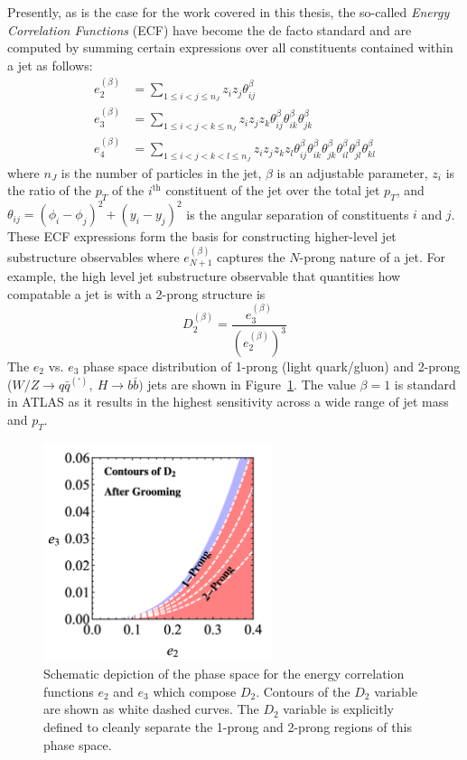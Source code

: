Presently, as is the case for the work covered in this thesis, the so-called \textit{Energy Correlation Functions} (ECF) \cite{Larkoski:2013eya, Moult:2016cvt} have become the de facto standard and are computed by summing certain expressions over all constituents contained within a jet as follows:
\begin{align}
    e_2^{(\beta)} &= \sum_{1 \le i < j \le n_J} z_i z_j \theta_{ij}^\beta \\
    e_3^{(\beta)} &= \sum_{1 \le i < j < k \le n_J} z_i z_j z_k \theta_{ij}^\beta \theta_{ik}^\beta \theta_{jk}^\beta \\
    e_4^{(\beta)} &= \sum_{1 \le i < j < k < l \le n_J} z_i z_j z_k z_l \theta_{ij}^\beta \theta_{ik}^\beta \theta_{jk}^\beta \theta_{il}^\beta \theta_{jl}^\beta \theta_{kl}^\beta
\end{align}
where $n_J$ is the number of particles in the jet, $\beta$ is an adjustable parameter, $z_i$ is the ratio of the $p_T$ of the $i^{\mathrm{th}}$ constituent of the jet over the total jet $p_T$, and $\theta_{ij} = (\phi_i - \phi_j)^2 + (y_i - y_j)^2$ is the angular separation of constituents $i$ and $j$.
These ECF expressions form the basis for constructing higher-level jet substructure observables where $e_{N+1}^{(\beta)}$ captures the $N$-prong nature of a jet. For example, the high level jet substructure observable that quantities how compatable a jet is with a 2-prong structure is
\begin{equation}
    D_2^{(\beta)} = \frac{e_3^{(\beta)}}{\left( e_2^{(\beta)} \right)^3} \end{equation}
The $e_2$ vs. $e_3$ phase space distribution of 1-prong (light quark/gluon) and 2-prong ($W/Z \rightarrow q\bar{q}^{(\prime)},\ H \rightarrow b\bar{b})$ jets are shown in Figure~\ref{fig:d2_plane_contours}.
The value $\beta = 1$ is standard in ATLAS as it results in the highest sensitivity across a wide range of jet mass and $p_T$.

\begin{figure}
	\centering
	\includegraphics[width=0.6\textwidth]{d2_plane_contours}
	\caption{
	Schematic depiction of the phase space for the energy correlation functions $e_2$ and $e_3$ which compose $D_2$.
	Contours of the $D_2$ variable are shown as white dashed curves.
	The $D_2$ variable is explicitly defined to cleanly separate the 1-prong and 2-prong regions of this phase space.
    \cite{Moult:2016cvt}
	}
	\label{fig:d2_plane_contours}
\end{figure}

